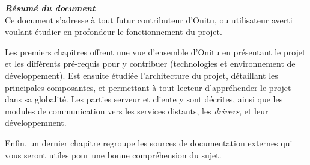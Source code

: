 \thispagestyle{empty}
\vspace*{10mm}

\textbf{\emph{\textcolor{onitu}{\large{Résumé du document} } } }\\

Ce document s'adresse à tout futur contributeur d'Onitu, ou utilisateur averti voulant étudier en profondeur le fonctionnement du projet.

Les premiers chapitres offrent une vue d'ensemble d'Onitu en présentant le projet et les différents pré-requis pour y contribuer (technologies et environnement de développement). Est ensuite étudiée l'architecture du projet, détaillant les principales composantes, et permettant à tout lecteur d'appréhender le projet dans sa globalité. Les parties serveur et cliente y sont décrites, ainsi que les modules de communication vers les services distants, les \emph{drivers}, et leur développemnent.

Enfin, un dernier chapitre regroupe les sources de documentation externes qui vous seront utiles pour une bonne compréhension du sujet.

\clearpage
